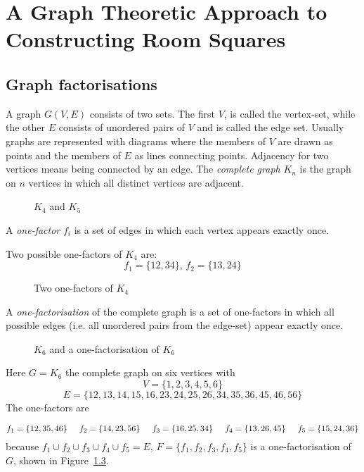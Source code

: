 \chapter{A Graph Theoretic Approach to Constructing Room Squares}
\label{ch:graph-theoretic}

\section{Graph factorisations}

A graph $G(V,E)$ consists of two sets.
The first $V$, is called the vertex-set, while the other $E$ consists of unordered pairs of $V$ and is called the edge set.
Usually graphs are represented with diagrams where the members of $V$ are drawn as points and the members of $E$ as lines connecting points.
Adjacency for two vertices means being connected by an edge.
The \emph{complete graph} $K_n$ is the graph on $n$ vertices in which all distinct vertices are adjacent.

\begin{figure}
  \centering
  
  \caption{$K_{4}$ and $K_{5}$}
  \label{fig:complete}
\end{figure}

A \emph{one-factor} $f_i$ is a set of edges in which each vertex appears exactly once.

\begin{example}
Two possible one-factors of $K_4$ are:
$$f_1 = \{12,34\},\, f_2 = \{13,24\}$$
\end{example}

\begin{figure}
  \centering
  
  \caption{Two one-factors of $K_{4}$}
  \label{fig:two-one-factors}
\end{figure}

A \emph{one-factorisation} of the complete graph is a set of one-factors in which all possible edges (i.e. all unordered pairs from the edge-set) appear exactly once.

\begin{figure}
  \centering
  
  \caption{$K_{6}$ and a one-factorisation of $K_{6}$}
  \label{fig:k6-factorisation}
\end{figure}

\begin{example}
Here
$G = K_6$
the complete graph on six vertices with
$$V = \{1, 2, 3, 4, 5, 6\}$$
$$E = \{12, 13, 14, 15, 16, 23, 24, 25, 26, 34, 35, 36, 45, 46, 56\}$$
The one-factors are

$$
f_1 = \{12, 35, 46\} \hspace{0.5cm}
f_2 = \{14, 23, 56\} \hspace{0.5cm}
f_3 = \{16, 25, 34\} \hspace{0.5cm}
f_4 = \{13, 26, 45\} \hspace{0.5cm} 
f_5 = \{15, 24, 36\}
$$
because
$f_1 \cup f_2 \cup f_3 \cup f_4 \cup f_5 = E$,
$F = \{f_1, f_2, f_3, f_4, f_5\}$
is a one-factorisation of
$G$,
shown in Figure~\ref{fig:k6-factorisation}.
\end{example}

